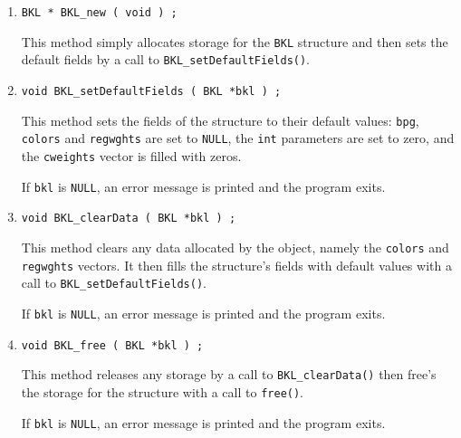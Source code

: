 \begin{enumerate}
\item
\begin{verbatim}
BKL * BKL_new ( void ) ;
\end{verbatim}
This method simply allocates storage for the {\tt BKL} structure 
and then sets the default fields by a call to 
{\tt BKL\_setDefaultFields()}.
\item
\begin{verbatim}
void BKL_setDefaultFields ( BKL *bkl ) ;
\end{verbatim}
This method sets the fields of the structure to their default
values:
{\tt bpg}, {\tt colors} and {\tt regwghts} are set to {\tt NULL},
the {\tt int} parameters are set to zero,
and the {\tt cweights} vector is filled with zeros.
\par {}
If {\tt bkl} is {\tt NULL},
an error message is printed and the program exits.
\item
\begin{verbatim}
void BKL_clearData ( BKL *bkl ) ;
\end{verbatim}
This method clears any data allocated by the object,
namely the {\tt colors} and {\tt regwghts} vectors.
It then fills the structure's fields with default values
with a call to {\tt BKL\_setDefaultFields()}.
\par {}
If {\tt bkl} is {\tt NULL},
an error message is printed and the program exits.
\item
\begin{verbatim}
void BKL_free ( BKL *bkl ) ;
\end{verbatim}
This method releases any storage by a call to 
{\tt BKL\_clearData()} then free's the storage for the 
structure with a call to {\tt free()}.
\par {}
If {\tt bkl} is {\tt NULL},
an error message is printed and the program exits.
\end{enumerate}
\par
